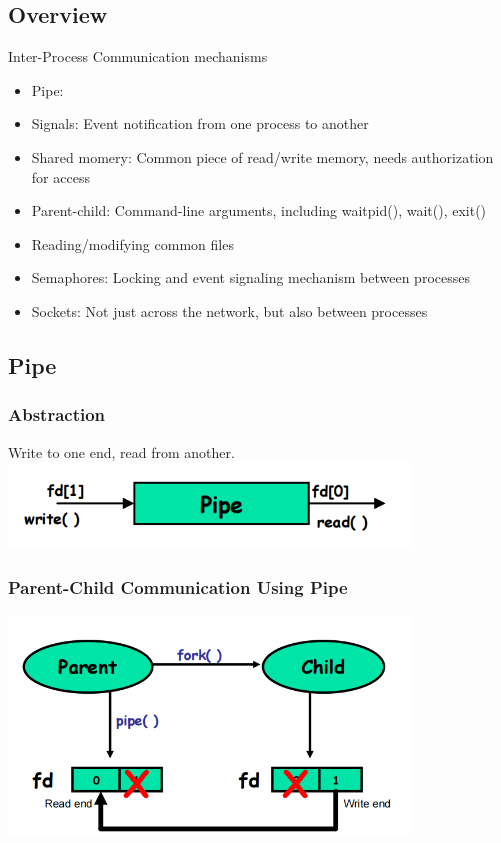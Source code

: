 \documentclass[12pt]{article}
\begin{document}
\subsection{Overview}
Inter-Process Communication mechanisms
\begin{itemize}
    \item Pipe: 
    \item Signals: Event notification from one process to another
    \item Shared momery: Common piece of read/write memory, needs authorization for access
    \item Parent-child: Command-line arguments, including waitpid(), wait(), exit()
    \item Reading/modifying common files
    \item Semaphores: Locking and event signaling mechanism between processes
    \item Sockets: Not just across the network, but also between processes
\end{itemize}

\subsection{Pipe}
\subsubsection{Abstraction}
Write to one end, read from another.
\newline
\includegraphics[width=0.8\textwidth]{PipeAbstraction.png}
\subsubsection{Parent-Child Communication Using Pipe}
\includegraphics[width=0.8\textwidth]{ParentChildCommunicationUsingPipe.png}
\end{document}

